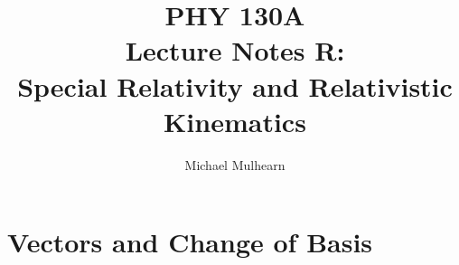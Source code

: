\documentclass[12pt]{article}
\begin{document}
\title{PHY 130A \\ Lecture Notes R: \\
Special Relativity and Relativistic Kinematics\\}
\author{Michael Mulhearn}

\maketitle

\setcounter{exercise}{0}

\newcommand{\exercise}{
\stepcounter{exercise}
\noindent
{\bf Exercise R.\theexercise:}
}

\section{Vectors and Change of Basis}
\label{sec:vectors}
\end{document}
